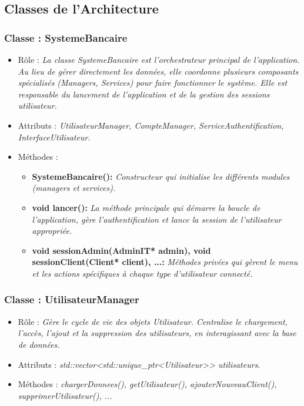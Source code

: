 \subsection{Classes de l'Architecture}

\subsubsection{Classe : SystemeBancaire}
\begin{itemize}[leftmargin=*]
\item Rôle : \textit{La classe SystemeBancaire est l'orchestrateur principal de l'application. Au lieu de gérer directement les données, elle coordonne plusieurs composants spécialisés (Managers, Services) pour faire fonctionner le système. Elle est responsable du lancement de l'application et de la gestion des sessions utilisateur.}
\item Attributs : \textit{UtilisateurManager, CompteManager, ServiceAuthentification, InterfaceUtilisateur.}
\item Méthodes : 
     \begin{itemize}[leftmargin=*]
      \item \textbf{SystemeBancaire():} \textit{Constructeur qui initialise les différents modules (managers et services).}
      \item \textbf{void lancer():} \textit{La méthode principale qui démarre la boucle de l'application, gère l'authentification et lance la session de l'utilisateur appropriée.}
      \item \textbf{void sessionAdmin(AdminIT* admin), void sessionClient(Client* client), ...:} \textit{Méthodes privées qui gèrent le menu et les actions spécifiques à chaque type d'utilisateur connecté.}
      \end{itemize}
\end{itemize} 

\subsubsection{Classe : UtilisateurManager}
\begin{itemize}[leftmargin=*]
\item Rôle : \textit{Gère le cycle de vie des objets Utilisateur. Centralise le chargement, l'accès, l'ajout et la suppression des utilisateurs, en interagissant avec la base de données.}
\item Attributs : \textit{std::vector<std::unique\_ptr<Utilisateur>> utilisateurs.}
\item Méthodes : \textit{chargerDonnees(), getUtilisateur(), ajouterNouveauClient(), supprimerUtilisateur(), ...}
\end{itemize}

